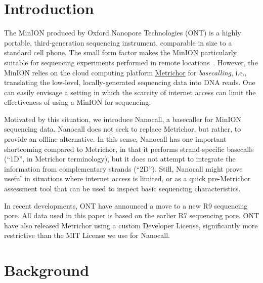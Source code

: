 \documentclass{bioinfo}
\begin{document}
\maketitle

\section{Introduction}

The MinION produced by Oxford Nanopore Technologies (ONT) is a highly portable, third-generation sequencing instrument, comparable in size to a standard cell phone. The small form factor makes the MinION particularly suitable for sequencing experiments performed in remote locations~\cite{quick-ebola}. However, the MinION relies on the cloud computing platform \href{metrichor.com}{Metrichor} for \emph{basecalling}, i.e., translating the low-level, locally-generated sequencing data into DNA reads. One can easily envisage a setting in which the scarcity of internet access can limit the effectiveness of using a MinION for sequencing.

Motivated by this situation, we introduce Nanocall, a basecaller for MinION sequencing data. Nanocall does not seek to replace Metrichor, but rather, to provide an offline alternative. In this sense, Nanocall has one important shortcoming compared to Metrichor, in that it performs strand-specific basecalls (``1D'', in Metrichor terminology), but it does not attempt to integrate the information from complementary strands (``2D''). Still, Nanocall might prove useful in situations where internet access is limited, or as a quick pre-Metrichor assessment tool that can be used to inspect basic sequencing characteristics.

In recent developments, ONT have announced a move to a new R9 sequencing pore. All data used in this paper is based on the earlier R7 sequencing pore. ONT have also released Metrichor using a custom Developer License, significantly more restrictive than the MIT License we use for Nanocall.

\section{Background}
\end{document}
